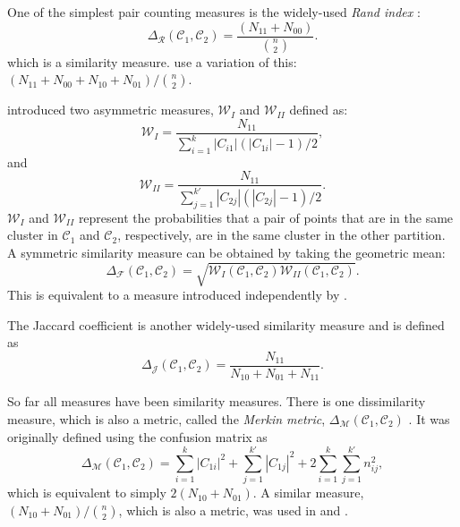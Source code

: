 \documentclass[a4paper]{report}
\newcommand{\clus}{\mathcal{C}}
\newcommand{\partcompare}[1]{\Delta_{\mathcal{#1}}(\clus_1,\clus_2)}
\begin{document}
One of the simplest pair counting measures is the widely-used \textit{Rand
  index} \citep{rand-1971}:
\begin{equation*}
\partcompare{R} = \frac{(N_{11}+N_{00})}{\binom{n}{2}}.
\end{equation*}
which is a similarity measure.  \citet{hubert-arabie-1985} use a variation of
this: $(N_{11}+N_{00}+N_{10}+N_{01})/\binom{n}{2}$.

\citet{wallace-1983} introduced two asymmetric measures, $\mathcal{W}_{I}$ and
$\mathcal{W}_{II}$ defined as:
\begin{equation*}
  \mathcal{W}_{I} = \frac{N_{11}}{\sum_{i=1}^{k} |C_{i1}|(|C_{1i}|-1)/2},
\end{equation*}
and
\begin{equation*}
  \mathcal{W}_{II} = \frac{N_{11}}{\sum_{j=1}^{k'} |C_{2j}|(|C_{2j}|-1)/2}.
\end{equation*}
$\mathcal{W}_{I}$ and $\mathcal{W}_{II}$ represent the probabilities that a
pair of points that are in the same cluster in $\clus_1$ and $\clus_2$,
respectively, are in the same cluster in the other partition.  A symmetric
similarity measure can be obtained by taking the geometric mean:
\begin{equation*}
  \partcompare{F} = \sqrt{\mathcal{W}_{I}(\clus_1,\clus_2)
                          \mathcal{W}_{II}(\clus_1,\clus_2)}.
\end{equation*}
This is equivalent to a measure introduced independently by
\citet{fowlkes-mallows-1983}.

The Jaccard coefficient is another widely-used similarity measure and is
defined as
\begin{equation*}
  \partcompare{J} = \frac{N_{11}}{N_{10}+N_{01}+N_{11}}.
\end{equation*}

So far all measures have been similarity measures.  There is one dissimilarity
measure, which is also a metric, called the \textit{Merkin metric},
$\partcompare{M}$ \citep{mirkin1996mathematical}.  It was originally defined
using the confusion matrix as
\begin{equation*}
  \partcompare{M} = \sum_{i=1}^{k} |C_{1i}|^2 +
                    \sum_{j=1}^{k'} |C_{1j}|^2 +
                    2\sum_{i=1}^{k}\sum_{j=1}^{k'} n_{ij}^2,
\end{equation*}
which is equivalent to simply $2(N_{10}+N_{01})$.  A similar measure,
$(N_{10}+N_{01})/\binom{n}{2}$, which is also a metric, was used in
\citet{mirkin1970measurement} and \citet{arabie1973multidimensional}.
\end{document}
